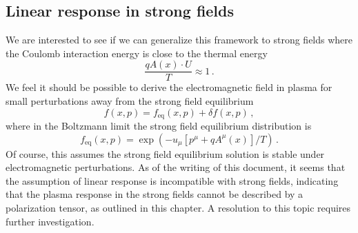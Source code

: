\subsection{Linear response in strong fields}
We are interested to see if we can generalize this framework to strong fields where the Coulomb interaction energy is close to the thermal energy
\begin{equation}
    \frac{ qA(x)\cdot U}{T}\approx 1\,.
\end{equation}
We feel it should be possible to derive the electromagnetic field in plasma for small perturbations away from the strong field equilibrium 
\begin{equation}
    f(x,p) = f_\text{eq}(x,p) + \delta f (x,p)\,,
\end{equation}
where in the Boltzmann limit the strong field equilibrium distribution is \cite{Hakim2011,Hakim:1967prd}
\begin{equation}
     f_\text{eq}(x,p) = \exp \left(-u_{\mu}[p^{\mu}+q A^{\mu}(x)]/T\right)\,.
\end{equation}
Of course, this assumes the strong field equilibrium solution is stable under electromagnetic perturbations. As of the writing of this document, it seems that the assumption of linear response is incompatible with strong fields, indicating that the plasma response in the strong fields cannot be described by a polarization tensor, as outlined in this chapter. A resolution to this topic requires further investigation.



